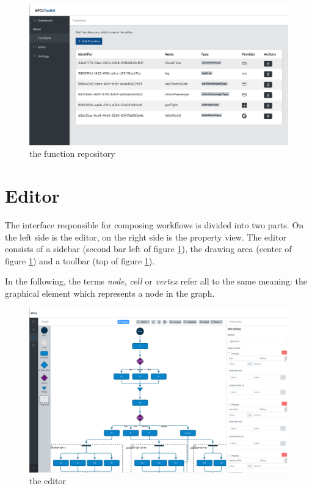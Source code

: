 \documentclass[a4paper,top=25mm,bottom=25mm,12pt,pdftex,halfparskip,twoside,bibtotoc,numbers=noenddot]{scrbook}
\begin{document}
\begin{figure}[H]
  \centering
  \includegraphics[width=\textwidth]{functions}
  \caption{the function repository}
\end{figure}

\section{Editor}
The interface responsible for composing workflows is divided into two parts. On the left side is the editor, on the right side is the property view. The editor consists of a sidebar (second bar left of figure \ref{fig:editor}), the drawing area (center of figure \ref{fig:editor}) and a toolbar (top of figure \ref{fig:editor}).

In the following, the terms \textit{node}, \textit{cell} or \textit{vertex} refer all to the same meaning: the graphical element which represents a node in the graph.

\begin{figure}[H]
  \centering
  \includegraphics[width=\textwidth]{editor}
  \caption{the editor}
  \label{fig:editor}
\end{figure}
\end{document}

